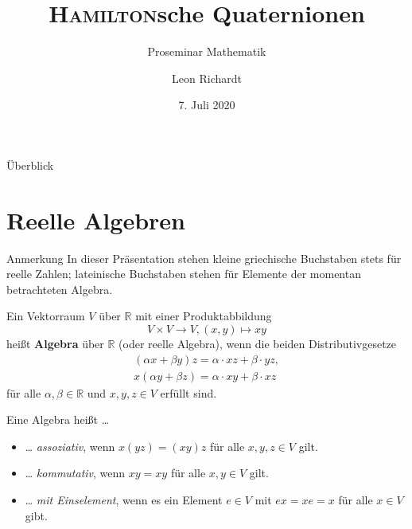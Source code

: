 \documentclass[aspectratio=169]{beamer}
\title{\textsc{Hamilton}sche Quaternionen}
\subtitle{Proseminar Mathematik}
\author[L.~Richardt]{Leon Richardt}
\date[2020-07-07]{7. Juli 2020}
\institute{Universität Osnabrück}
\newcommand{\R}{\ensuremath{\mathbb{R}}{ }}
\begin{document}
    \begin{frame}
        \titlepage
    \end{frame}

    \begin{frame}{Überblick}
        \tableofcontents
    \end{frame}

    \section{Reelle Algebren}
    \begin{frame}
        \begin{block}{Anmerkung}
            In dieser Präsentation stehen kleine griechische Buchstaben stets für reelle Zahlen; lateinische Buchstaben stehen für Elemente der momentan betrachteten Algebra.
        \end{block}
    \end{frame}

    \begin{frame}
        \begin{definition}
            Ein Vektorraum \(V\) über \R mit einer Produktabbildung
            \[
                V \times V \to V, (x, y) \mapsto xy
            \] 
            heißt \textbf{Algebra} über \R (oder reelle Algebra), wenn die beiden Distributivgesetze
            \begin{gather*}
                (\alpha x + \beta y) z = \alpha \cdot xz + \beta \cdot yz, \\
                x (\alpha y + \beta z) = \alpha \cdot xy + \beta \cdot xz
            \end{gather*}
            für alle \(\alpha, \beta \in \R\) und \(x, y, z \in V\) erfüllt sind.
        \end{definition}
    \end{frame}

    \begin{frame}
        \begin{definition}
            Eine Algebra heißt \dots
            \begin{itemize}
                \item
                    \dots{} \textit{assoziativ}, wenn \(x(yz) = (xy)z\) für alle \(x, y, z \in V\) gilt.
                \item
                    \dots{} \textit{kommutativ}, wenn \(xy = xy\) für alle \(x, y \in V\) gilt.
                \item
                    \dots{} \textit{mit Einselement}, wenn es ein Element \(e \in V\) mit \(ex = xe = x\) für alle \(x \in V\) gibt.
            \end{itemize}
        \end{definition}
    \end{frame}
\end{document}
